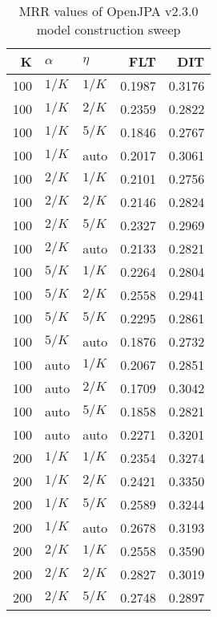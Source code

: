 
\begin{table}
\begin{spacing}{1.2}
\centering
\caption{MRR values of OpenJPA v2.3.0 model construction sweep}
\label{table:openjpa_model_sweep}
\vspace{0.2em}
\parbox{.45\linewidth}{\centering \begin{tabular}{rll|rr}
\toprule
   K &  $\alpha$ &    $\eta$ & FLT & DIT \\
\midrule
 100 &  $1/K$ &  $1/K$ &           0.1987 & 0.3176 \\
 100 &  $1/K$ &  $2/K$ &           0.2359 & 0.2822 \\
 100 &  $1/K$ &  $5/K$ &           0.1846 & 0.2767 \\
 100 &  $1/K$ &   auto &           0.2017 & 0.3061 \\
 100 &  $2/K$ &  $1/K$ &           0.2101 & 0.2756 \\
 100 &  $2/K$ &  $2/K$ &           0.2146 & 0.2824 \\
 100 &  $2/K$ &  $5/K$ &           0.2327 & 0.2969 \\
 100 &  $2/K$ &   auto &           0.2133 & 0.2821 \\
 100 &  $5/K$ &  $1/K$ &           0.2264 & 0.2804 \\
 100 &  $5/K$ &  $2/K$ &           0.2558 & 0.2941 \\
 100 &  $5/K$ &  $5/K$ &           0.2295 & 0.2861 \\
 100 &  $5/K$ &   auto &           0.1876 & 0.2732 \\
 100 &   auto &  $1/K$ &           0.2067 & 0.2851 \\
 100 &   auto &  $2/K$ &           0.1709 & 0.3042 \\
 100 &   auto &  $5/K$ &           0.1858 & 0.2821 \\
 100 &   auto &   auto &           0.2271 & 0.3201 \\
 200 &  $1/K$ &  $1/K$ &           0.2354 & 0.3274 \\
 200 &  $1/K$ &  $2/K$ &           0.2421 & 0.3350 \\
 200 &  $1/K$ &  $5/K$ &           0.2589 & 0.3244 \\
 200 &  $1/K$ &   auto &           0.2678 & 0.3193 \\
 200 &  $2/K$ &  $1/K$ &           0.2558 & 0.3590 \\
 200 &  $2/K$ &  $2/K$ &           0.2827 & 0.3019 \\
 200 &  $2/K$ &  $5/K$ &           0.2748 & 0.2897 \\

\end{tabular}}
\end{spacing}
\end{table}
